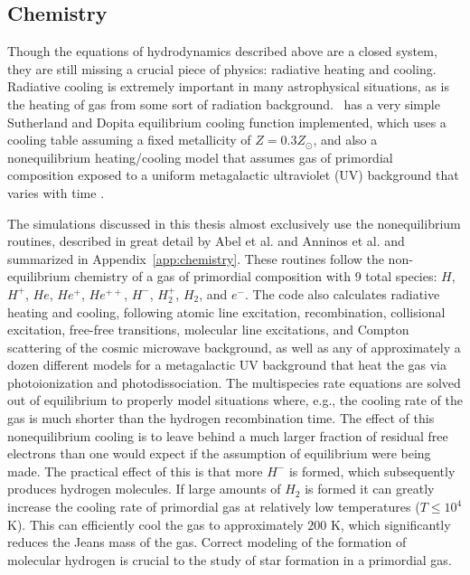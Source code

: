 \subsection{Chemistry}
\label{sec.ov.chem}


Though the equations of hydrodynamics described above are a closed system,
they are still missing a crucial piece of physics: radiative heating and cooling.
Radiative cooling is extremely important in many astrophysical situations, as is 
the heating of gas from some sort of radiation background.  \enzo\ has a very simple
Sutherland and Dopita equilibrium cooling function \citep{1993ApJS...88..253S} 
implemented, which uses a
cooling table assuming a fixed metallicity of $Z = 0.3 Z_\odot$, and also a
nonequilibrium heating/cooling model that assumes gas of primordial composition exposed to a
uniform metagalactic ultraviolet (UV) background that varies with time \citep{1996ApJS..105...19K}.  

The simulations discussed in this thesis almost exclusively use the nonequilibrium
routines, described in great detail by Abel et al. and Anninos et al.  
\citep{abel97,anninos97} and summarized in Appendix~\ref{app:chemistry}. These 
routines follow the non-equilibrium chemistry of a 
gas of primordial composition with 9 total species:  
$H$, $H^+$, $He$, $He^+$, $He^{++}$, $H^-$, $H_2^+$, $H_2$, and $e^-$.  The code also calculates 
radiative heating and cooling, following atomic line excitation, recombination,
collisional excitation, free-free transitions, molecular line excitations, and Compton
scattering of the cosmic microwave background, as well as any of
approximately a dozen different models for a metagalactic UV background that heat
the gas via photoionization and photodissociation. 
The multispecies rate equations are solved out of
equilibrium to properly model situations where, e.g., the cooling rate of the gas
is much shorter than the hydrogen recombination time.  The effect of this nonequilibrium
cooling is to leave behind a much larger fraction of residual free electrons than one would
expect if the assumption of equilibrium were being made.  The practical effect of this
is that more $H^-$ is formed, which subsequently produces hydrogen molecules.  If large
amounts of $H_2$ is formed it can greatly increase the cooling rate of primordial gas
at relatively low temperatures ($T \leq 10^4$ K).  This can efficiently cool the gas 
to approximately $200$ K, which significantly reduces the Jeans mass of the gas.  Correct
modeling of the formation of molecular hydrogen is crucial to the study of star formation
in a primordial gas.

